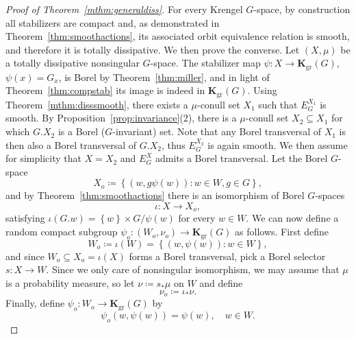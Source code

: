 \documentclass{amsart}
\numberwithin{equation}{subsection}
\begin{document}
\begin{proof}[Proof of Theorem~\ref{mthm:generaldiss}]
For every Krengel \(G\)-space, by construction all stabilizers are compact and, as demonstrated in Theorem~\ref{thm:smoothactions}, its associated orbit equivalence relation is smooth, and therefore it is totally dissipative. We then prove the converse. Let \(\left(X,\mu\right)\) be a totally dissipative nonsingular \(G\)-space. The stabilizer map \(\psi:X\to\mathbf{K}_{\mathrm{gr}}\left(G\right)\), \(\psi\left(x\right)=G_{x}\), is Borel by Theorem~\ref{thm:miller}, and in light of Theorem~\ref{thm:compstab} its image is indeed in \(\mathbf{K}_{\mathrm{gr}}\left(G\right)\). Using Theorem~\ref{mthm:disssmooth}, there exists a \(\mu\)-conull set \(X_{1}\) such that \(E_{G}^{X_{1}}\) is smooth. By Proposition~\ref{prop:invariance}(2), there is a \(\mu\)-conull set \(X_{2}\subseteq X_{1}\) for which \(G.X_{2}\) is a Borel (\(G\)-invariant) set. Note that any Borel transversal of \(X_{1}\) is then also a Borel transversal of \(G.X_{2}\), thus \(E_{G}^{X_{2}}\) is again smooth. We then assume for simplicity that \(X=X_{2}\) and \(E_{G}^{X}\) admits a Borel transversal. Let the Borel \(G\)-space
\[X_{o}\coloneqq \left\{\left(w,g\psi\left(w\right)\right):w\in W,g\in G\right\},\]
and by Theorem~\ref{thm:smoothactions} there is an isomorphism of Borel \(G\)-spaces
\[\iota:X\to X_{o},\]
satisfying \(\iota\left(G.w\right)=\left\{w\right\}\times G/\psi\left(w\right)\) for every \(w\in W\). We can now define a random compact subgroup \(\psi_{o}:\left(W_{o},\nu_{o}\right)\to\mathbf{K}_{\mathrm{gr}}\left(G\right)\) as follows. First define
\[W_{o}\coloneqq \iota\left(W\right)=\left\{ \left(w,\psi\left(w\right)\right):w\in W\right\},\]
and since \(W_{o}\subseteq X_{o}=\iota\left(X\right)\) forms a Borel transversal, pick a Borel selector \(s:X\to W\). Since we only care of nonsingular isomorphism, we may assume that \(\mu\) is a probability measure, so let \(\nu\coloneqq s_{\ast}\mu\) on \(W\) and define
\[\nu_{o}\coloneqq \iota_{\ast}\nu.\]
Finally, define \(\psi_{o}:W_{o}\to\mathbf{K}_{\mathrm{gr}}\left(G\right)\) by
\[\psi_{o}\left(w,\psi\left(w\right)\right)=\psi\left(w\right),\quad w\in W.\]


\end{proof}
\end{document}
